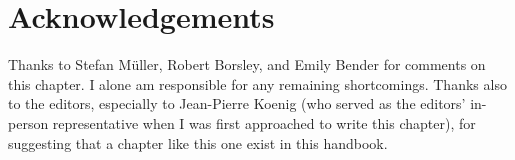 \documentclass[output=paper]{langsci/langscibook}
\begin{document}
{\section*{Acknowledgements}

Thanks to Stefan M{\"u}ller, Robert Borsley, and Emily Bender for comments on this chapter. I alone am responsible for any remaining shortcomings. Thanks also to the editors, especially to Jean-Pierre Koenig (who served as the editors' in-person representative when I was first approached to write this chapter), for suggesting that a chapter like this one exist in this handbook.  
 
}
\printbibliography[heading=subbibliography,notkeyword=this]
\end{document}
